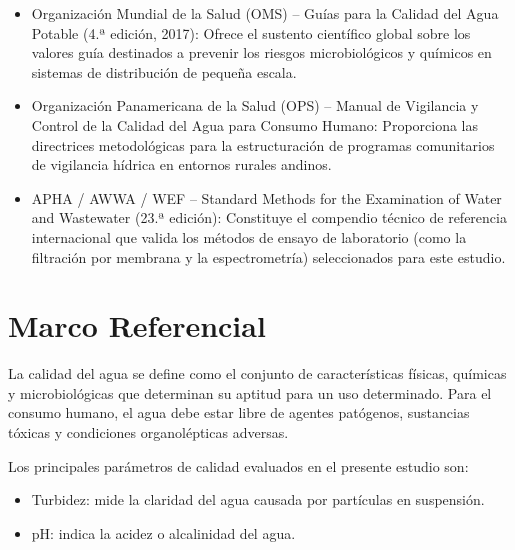 \begin{itemize}
    \item Organización Mundial de la Salud (OMS) – Guías para la Calidad del Agua Potable (4.ª edición, 2017): Ofrece el sustento científico global sobre los valores guía destinados a prevenir los riesgos microbiológicos y químicos en sistemas de distribución de pequeña escala.
    \item Organización Panamericana de la Salud (OPS) – Manual de Vigilancia y Control de la Calidad del Agua para Consumo Humano: Proporciona las directrices metodológicas para la estructuración de programas comunitarios de vigilancia hídrica en entornos rurales andinos.
    \item APHA / AWWA / WEF – Standard Methods for the Examination of Water and Wastewater (23.ª edición): Constituye el compendio técnico de referencia internacional que valida los métodos de ensayo de laboratorio (como la filtración por membrana y la espectrometría) seleccionados para este estudio.
\end{itemize}

\section{Marco Referencial}

La calidad del agua se define como el conjunto de características físicas, químicas y microbiológicas que determinan su aptitud para un uso determinado. Para el consumo humano, el agua debe estar libre de agentes patógenos, sustancias tóxicas y condiciones organolépticas adversas.

Los principales parámetros de calidad evaluados en el presente estudio son:

\begin{itemize}
    \item Turbidez: mide la claridad del agua causada por partículas en suspensión.
    \item pH: indica la acidez o alcalinidad del agua.
\end{itemize}

